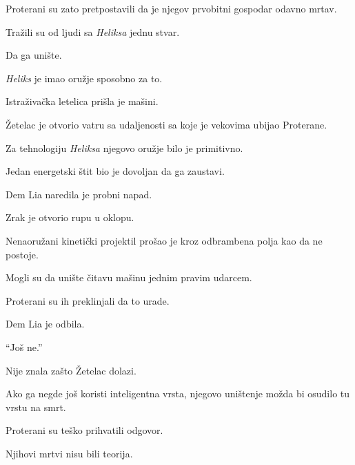 \bigskip

Proterani su zato pretpostavili da je njegov prvobitni gospodar odavno mrtav.

\bigskip

Tražili su od ljudi sa \emph{Heliksa} jednu stvar.

\bigskip

Da ga unište.

\bigskip

\emph{Heliks} je imao oružje sposobno za to.

\bigskip

Istraživačka letelica prišla je mašini.

\bigskip

Žetelac je otvorio vatru sa udaljenosti sa koje je vekovima ubijao Proterane.

\bigskip

Za tehnologiju \emph{Heliksa} njegovo oružje bilo je primitivno.

\bigskip

Jedan energetski štit bio je dovoljan da ga zaustavi.

\bigskip

Dem Lia naredila je probni napad.

\bigskip

Zrak je otvorio rupu u oklopu.

Nenaoružani kinetički projektil prošao je kroz odbrambena polja kao da ne postoje.

\bigskip

Mogli su da unište čitavu mašinu jednim pravim udarcem.

\bigskip

Proterani su ih preklinjali da to urade.

\bigskip

Dem Lia je odbila.

\bigskip

``Još ne.''

\bigskip

Nije znala zašto Žetelac dolazi.

\bigskip

Ako ga negde još koristi inteligentna vrsta, njegovo uništenje možda bi osudilo tu vrstu na smrt.

\bigskip

Proterani su teško prihvatili odgovor.

\bigskip

Njihovi mrtvi nisu bili teorija.

\bigskip

